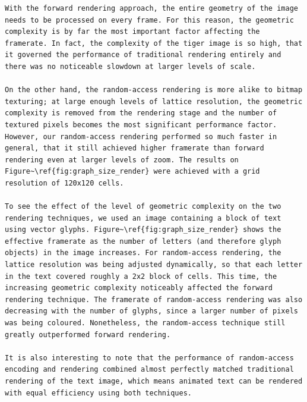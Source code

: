 \documentclass[11pt,a4paper,twoside]{article}
\begin{document}
\begin {verbatim}
With the forward rendering approach, the entire geometry of the image needs to be processed on every frame. For this reason, the geometric complexity is by far the most important factor affecting the framerate. In fact, the complexity of the tiger image is so high, that it governed the performance of traditional rendering entirely and there was no noticeable slowdown at larger levels of scale.

On the other hand, the random-access rendering is more alike to bitmap texturing; at large enough levels of lattice resolution, the geometric complexity is removed from the rendering stage and the number of textured pixels becomes the most significant performance factor. However, our random-access rendering performed so much faster in general, that it still achieved higher framerate than forward rendering even at larger levels of zoom. The results on Figure~\ref{fig:graph_size_render} were achieved with a grid resolution of 120x120 cells.

To see the effect of the level of geometric complexity on the two rendering techniques, we used an image containing a block of text using vector glyphs. Figure~\ref{fig:graph_size_render} shows the effective framerate as the number of letters (and therefore glyph objects) in the image increases. For random-access rendering, the lattice resolution was being adjusted dynamically, so that each letter in the text covered roughly a 2x2 block of cells. This time, the increasing geometric complexity noticeably affected the forward rendering technique. The framerate of random-access rendering was also decreasing with the number of glyphs, since a larger number of pixels was being coloured. Nonetheless, the random-access technique still greatly outperformed forward rendering.

It is also interesting to note that the performance of random-access encoding and rendering combined almost perfectly matched traditional rendering of the text image, which means animated text can be rendered with equal efficiency using both techniques.


\end{verbatim}
\end{document}
